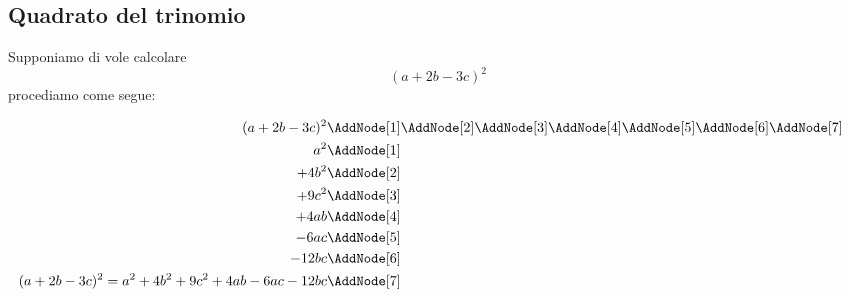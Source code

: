 \subsection{Quadrato del trinomio}
\begin{esempio}
Supponiamo di vole calcolare \[(a+2b-3c)^2\]
procediamo come segue:
\begin{NodesList}
	\begin{align*}
(a+2b-3c)^2&\AddNode[1]\AddNode[2]\AddNode[3]\AddNode[4]\AddNode[5]\AddNode[6]\AddNode[7]\\
		a^2&\AddNode[1]&\\ 
		+4b^2&\AddNode[2]&\\
		+9c^2&\AddNode[3]\\
		+4ab&\AddNode[4]\\
		-6ac&\AddNode[5]\\
		-12bc&\AddNode[6]\\
		(a+2b-3c)^2=a^2+4b^2+9c^2+4ab-6ac-12bc&\AddNode[7]
	\end{align*}
\end{NodesList}
\end{esempio}
